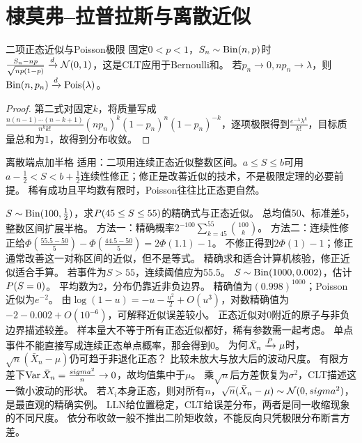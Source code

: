 \section{棣莫弗--拉普拉斯与离散近似}\label{sec:54}
\begin{corollary}{二项正态近似与Poisson极限}
固定$0<p<1$，$S_n\sim\operatorname{Bin}(n,p)$时$\frac{S_n-np}{\sqrt{np(1-p)}}\xrightarrow{d}\mathcal N(0,1)$，这是CLT应用于Bernoulli和。
若$p_n\to0,np_n\to\lambda$，则$\operatorname{Bin}(n,p_n)\xrightarrow{d}\operatorname{Pois}(\lambda)$。
\end{corollary}
\begin{proof}
第二式对固定$k$，将质量写成
$\frac{n(n-1)\cdots(n-k+1)}{n^k k!}(np_n)^k(1-p_n)^n(1-p_n)^{-k}$，逐项极限得到$\frac{e^{-\lambda}\lambda^k}{k!}$，目标质量总和为1，故得到分布收敛。
\end{proof}
\begin{method}{离散端点加半格}
适用：二项用连续正态近似整数区间。$a\le S\le b$可用$a-\frac{1}{2}<S<b+\frac{1}{2}$连续性修正；修正是改善近似的技术，不是极限定理的必要前提。
稀有成功且平均数有限时，Poisson往往比正态更自然。
\end{method}
{$S\sim\operatorname{Bin}(100,\frac{1}{2})$，求$P(45\le S\le55)$的精确式与正态近似。}
{总均值50、标准差5，整数区间扩展半格。}
{方法一：精确概率$2^{-100}\sum_{k=45}^{55}\binom{100}k$。
方法二：连续性修正给$\Phi(\frac{55.5-50}{5})-\Phi(\frac{44.5-50}{5})=2\Phi(1.1)-1$。
不修正得到$2\Phi(1)-1$；修正通常改善这一对称区间的近似，但不是等式。}
{精确求和适合计算机核验，修正近似适合手算。}
{若事件为$S>55$，连续阈值应为55.5。}
{$S\sim\operatorname{Bin}(1000,0.002)$，估计$P(S=0)$。}
{平均数为2，分布仍靠近非负边界。}
{精确值为$(0.998)^{1000}$；Poisson近似为$e^{-2}$。
由$\log(1-u)=-u-\frac{u^2}{2}+O(u^3)$，对数精确值为$-2-0.002+O(10^{-6})$，可解释近似误差较小。
正态近似对0附近的原子与非负边界描述较差。}
{样本量大不等于所有正态近似都好，稀有参数需一起考虑。}
{单点事件不能直接写成连续正态单点概率，那会得到0。}
{为何$\bar X_n\xrightarrow{P}\mu$时，$\sqrt n(\bar X_n-\mu)$仍可趋于非退化正态？}
{比较未放大与放大后的波动尺度。}
{有限方差下$\operatorname{Var}\bar X_n=\frac{sigma^2}{n}\to0$，故均值集中于$\mu$。
乘$\sqrt n$后方差恢复为$\sigma^2$，CLT描述这一微小波动的形状。
若$X_i$本身正态，则对所有$n$，$\sqrt n(\bar X_n-\mu)\sim\mathcal N(0,sigma^2)$，是最直观的精确实例。}
{LLN给位置稳定，CLT给误差分布，两者是同一收缩现象的不同尺度。}
{依分布收敛一般不推出二阶矩收敛，不能反向只凭极限分布断言方差。}

